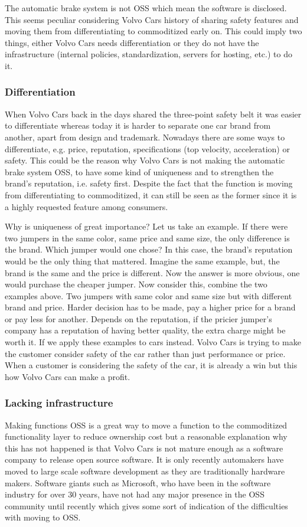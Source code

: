 \documentclass[conference]{IEEEtran}
\begin{document}
The automatic brake system is not OSS which mean the software is disclosed. This seems peculiar considering Volvo Cars history of sharing safety features and moving them from differentiating to commoditized early on. This could imply two things, either Volvo Cars needs differentiation or they do not have the infrastructure (internal policies, standardization, servers for hosting, etc.) to do it.

\subsubsection{Differentiation}
When Volvo Cars back in the days shared the three-point safety belt it was easier to differentiate whereas today it is harder to separate one car brand from another, apart from design and trademark. Nowadays there are some ways to differentiate, e.g. price, reputation, specifications (top velocity, acceleration) or safety. This could be the reason why Volvo Cars is not making the automatic brake system OSS, to have some kind of uniqueness and to strengthen the brand's reputation, i.e. safety first. Despite the fact that the function is moving from differentiating to commoditized, it can still be seen as the former since it is a highly requested feature among consumers. \cite{AEBStatistics,VolvoVision}

Why is uniqueness of great importance? Let us take an example. If there were two jumpers in the same color, same price and same size, the only difference is the brand. Which jumper would one chose? In this case, the brand's reputation would be the only thing that mattered. Imagine the same example, but, the brand is the same and the price is different. Now the answer is more obvious, one would purchase the cheaper jumper. Now consider this, combine the two examples above. Two jumpers with same color and same size but with different brand and price. Harder decision has to be made, pay a higher price for a brand or pay less for another. Depends on the reputation, if the pricier jumper's company has a reputation of having better quality, the extra charge might be worth it. If we apply these examples to cars instead. Volvo Cars is trying to make the customer consider safety of the car rather than just performance or price. When a customer is considering the safety of the car, it is already a win but this how Volvo Cars can make a profit.

\subsubsection{Lacking infrastructure}
Making functions OSS is a great way to move a function to the commoditized functionality layer to reduce ownership cost but a  reasonable explanation why this has not happened is that Volvo Cars is not mature enough as a software company to release open source software. It is only recently automakers have moved to large scale software development as they are traditionally hardware makers. Software giants such as Microsoft, who have been in the software industry for over 30 years, have not had any major presence in the OSS community until recently which gives some sort of indication of the difficulties with moving to OSS.
\end{document}
